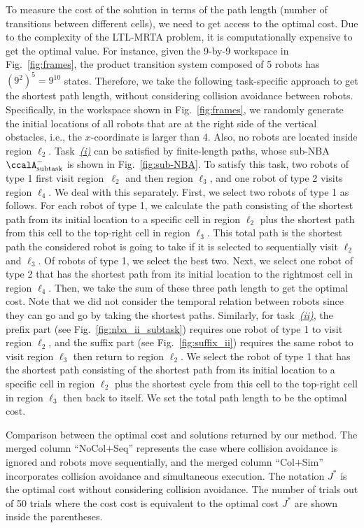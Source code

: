 \documentclass[Afour,sageh,times]{sagej}
\newcommand{\auto}[1]{\ccalA_{\textup{#1}}}
\begin{document}
{{To measure the cost of the solution in terms of the path length (number of transitions between different cells), we need to get access to the optimal cost. Due to the complexity of the LTL-MRTA problem, it is computationally expensive to get the optimal value. For instance, given the 9-by-9 workspace in Fig.~\ref{fig:frames}, the product transition system composed of 5 robots has $(9^2)^5=9^{10}$ states. Therefore, we take the following task-specific approach to get the shortest path length, without considering collision avoidance between robots. Specifically, in the workspace shown in Fig.~\ref{fig:frames},  we randomly generate the initial locations
of all robots that are at the right side of the vertical obstacles, i.e., the $x$-coordinate is larger than 4. Also, no robots are located inside region $\ell_2$. Task~\hyperref[task:i]{\it (i)} can be satisfied by finite-length paths, whose sub-NBA $\auto{subtask}^-$ is shown in Fig.~\ref{fig:sub-NBA}. To satisfy this task, two robots of type 1 first visit region~$\ell_2$ and then region $\ell_3$, and one robot of type 2 visits region $\ell_4$. We deal with this separately. First, we select two robots of type 1 as follows. For each robot of type 1, we calculate the path consisting of the shortest path from its initial location to a specific cell in region $\ell_2$ plus the shortest path from this cell to the  top-right cell in region $\ell_3$.  This total path is the shortest path the considered robot is going to  take if it is selected to sequentially visit $\ell_2$ and $\ell_3$. Of robots of type 1, we select the best two. Next, we select one robot of type 2 that has the shortest path from its initial location to the  rightmost cell in region $\ell_4$. Then, we take the sum of these three path length to get the optimal cost. Note that we did not consider the temporal relation between robots since they can go and go by taking the shortest paths. Similarly, for task~\hyperref[task:ii]{\it (ii)}, the prefix part (see Fig.~\ref{fig:nba_ii_subtask}) requires one robot of type 1 to visit region $\ell_2$, and the suffix part (see  Fig.~\ref{fig:suffix_ii}) requires the same robot to visit region $\ell_3$ then return to region $\ell_2$. We select the robot of type 1 that has the shortest path consisting of the shortest path from its initial location to a specific cell in region $\ell_2$ plus the shortest cycle from this cell to the top-right cell in region $\ell_3$ then back to itself. We set the total path length to  be the optimal cost.
\begin{table}[!t]
  \caption{Comparison between the optimal cost and solutions returned by our method. The merged column ``NoCol$+$Seq'' represents the case where collision avoidance is ignored and robots move sequentially, and the merged column ``Col$+$Sim'' incorporates collision avoidance and simultaneous execution. The notation $J^*$ is the optimal cost without considering collision avoidance. The number of trials out of 50 trials where the cost cost is equivalent to the optimal cost $J^*$ are shown inside the parentheses.}

\end{table}}}
\end{document}
